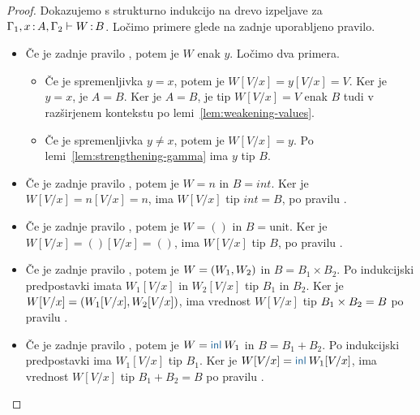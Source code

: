 \begin{proof}
	Dokazujemo s strukturno indukcijo na drevo izpeljave za $\Gamma_1, x \mathinner{:} A, \Gamma_2 \vdash W \mathinner{:} B$.
	Ločimo primere glede na zadnje uporabljeno pravilo.
	
	\begin{itemize}
		\item[\sitem] 
		Če je zadnje pravilo , potem je $W$ enak $y$. Ločimo dva primera.
		\begin{itemize}
			\item Če je spremenljivka $y = x$, potem je $W[V/x] = y[V/x] = V$. Ker je $y = x$, je $A = B$. Ker je $A = B$, je tip $W[V/x] = V$ enak $B$ tudi v razširjenem kontekstu po lemi~\ref{lem:weakening-values}.
			\item Če je spremenljivka $y \neq x$, potem je $W[V/x] = y$. Po lemi~\ref{lem:strengthening-gamma} ima $y$ tip $B$.
		\end{itemize}
		
	
		\item Če je zadnje pravilo , potem je $W=n$ in $B=int$. Ker je $W[V/x] = n[V/x] = n$, ima $W[V/x]$ tip $int = B$, po pravilu .
		
		\item Če je zadnje pravilo , potem je $W=()$ in $B=\text{unit}$. Ker je $W[V/x] = ()[V/x] = ()$, ima $W[V/x]$ tip $B$, po pravilu .
		
		\item Če je zadnje pravilo , potem je $W =( W_1 , W_2 )$ in $B = B_1 \times B_2$. Po indukcijski predpostavki imata $W_1[V/x]$ in $W_2[V/x]$ tip $B_1$ in $B_2$.
		Ker je $W[V/x] = ( W_1[V/x] , W_2[V/x] )$, ima vrednost $W[V/x]$ tip $B_1 \times B_2 = B$ po pravilu .
		
		\item Če je zadnje pravilo , potem je $W = \tminl{W_1}$ in $B = B_1 + B_2$. Po indukcijski predpostavki ima $W_1[V/x]$ tip $B_1$.
		Ker je $W[V/x] = \tminl{W_1[V/x]}$, ima vrednost $W[V/x]$ tip $B_1 + B_2 = B$ po pravilu .
		

\end{itemize}
\end{proof}

